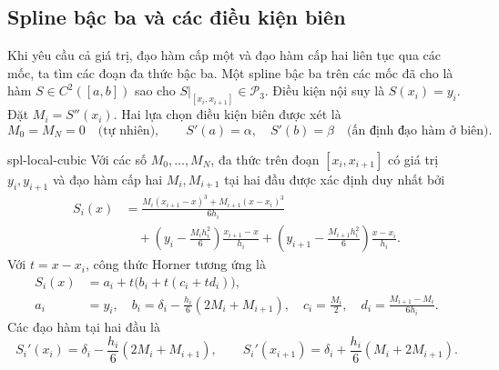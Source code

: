 \documentclass[12pt,a4paper,oneside]{book}
\numberwithin{algorithm}{chapter}
\theoremstyle{definition}
\begin{document}
\subsection{Spline bậc ba và các điều kiện biên}
Khi yêu cầu cả giá trị, đạo hàm cấp một và đạo hàm cấp hai liên tục qua các mốc, ta tìm các đoạn đa thức bậc ba. Một spline bậc ba trên các mốc đã cho là hàm $S\in C^2([a,b])$ sao cho $S|_{[x_i,x_{i+1}]}\in\mathcal P_3$. Điều kiện nội suy là $S(x_i)=y_i$. Đặt $M_i=S''(x_i)$. Hai lựa chọn điều kiện biên được xét là
\[
 M_0=M_N=0\quad\text{(tự nhiên)},\qquad
 S'(a)=\alpha,\quad S'(b)=\beta\quad\text{(ấn định đạo hàm ở biên)}.
\]
\begin{menhde}{}{spl-local-cubic}
Với các số $M_0,\ldots,M_N$, đa thức trên đoạn $[x_i,x_{i+1}]$ có giá trị $y_i,y_{i+1}$ và đạo hàm cấp hai $M_i,M_{i+1}$ tại hai đầu được xác định duy nhất bởi
\begin{equation}\label{eq:spl-cubic}
 \begin{aligned}
 S_i(x)&=\frac{M_i(x_{i+1}-x)^3+M_{i+1}(x-x_i)^3}{6h_i}\\
 &\quad+\left(y_i-\frac{M_ih_i^2}6\right)\frac{x_{i+1}-x}{h_i}
 +\left(y_{i+1}-\frac{M_{i+1}h_i^2}6\right)\frac{x-x_i}{h_i}.
 \end{aligned}
\end{equation}
Với $t=x-x_i$, công thức Horner tương ứng là
\begin{equation}\label{eq:spl-horner}
 \begin{aligned}
 S_i(x)&=a_i+t\bigl(b_i+t(c_i+td_i)\bigr),\\
 a_i&=y_i,\quad b_i=\delta_i-\frac{h_i}6(2M_i+M_{i+1}),\quad
 c_i=\frac{M_i}2,\quad d_i=\frac{M_{i+1}-M_i}{6h_i}.
 \end{aligned}
\end{equation}
Các đạo hàm tại hai đầu là
\[
 S_i'(x_i)=\delta_i-\frac{h_i}6(2M_i+M_{i+1}),\qquad
 S_i'(x_{i+1})=\delta_i+\frac{h_i}6(M_i+2M_{i+1}).
\]
\end{menhde}
\end{document}
